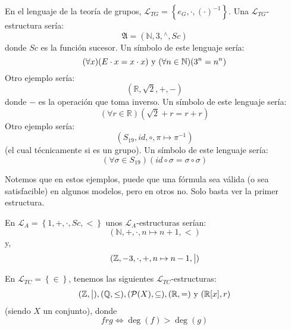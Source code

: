 \documentclass[12pt]{report}
\theoremstyle{largebreak}
\newcommand\divides{\ensuremath{\bigm|}}
\begin{document}
    \begin{exa}
        En el lenguaje de la teoría de grupos, $\mathcal{L}_{TG}=\left\{e_G,\cdot,(\cdot)^{-1} \right\}$. Una $\mathcal{L}_{TG}$-estructura sería:
        \begin{equation*}
            \mathfrak{A}=(\mathbb{N},3,{}^{\wedge},Sc)
        \end{equation*}
        donde $Sc$ es la función sucesor. Un símbolo de este lenguaje sería:
        \begin{equation*}
            (\forall x)(E\cdot x=x\cdot x)\textup{ y }(\forall n\in\mathbb{N})(3^n=n^n)
        \end{equation*}
        Otro ejemplo sería:
        \begin{equation*}
            (\mathbb{R},\sqrt{2},+,-)
        \end{equation*}
        donde $-$ es la operación que toma inverso. Un símbolo de este lenguaje sería:
        \begin{equation*}
            (\forall r\in\mathbb{R})(\sqrt{2}+r=r+r)
        \end{equation*}        
        Otro ejemplo sería:
        \begin{equation*}
            (S_{19},id,\circ,\pi\mapsto\pi^{-1})
        \end{equation*}
        (el cual técnicamente si es un grupo). Un símbolo de este lenguaje sería:
        \begin{equation*}
            (\forall \sigma\in S_{19})(id\circ\sigma=\sigma\circ\sigma)
        \end{equation*}
    \end{exa}

    Notemos que en estos ejemplos, puede que una fórmula sea válida (o sea satisfacible) en algunos modelos, pero en otros no. Solo basta ver la primer estructura.

    \begin{exa}
        En $\mathcal{L}_{A}=\left\{1,+,\cdot,Sc,< \right\}$ unos $\mathcal{L}_A$-estructuras serían:
        \begin{equation*}
            (\mathbb{N},+,\cdot,n\mapsto n+1,<)
        \end{equation*}
        y,
        \begin{equation*}
            (\mathbb{Z},-3,\cdot,+,n\mapsto n-1,\divides)
        \end{equation*}
    \end{exa}

    \begin{exa}
        En $\mathcal{L}_{TC}=\left\{\in \right\}$, tenemos las siguientes $\mathcal{L}_{TC}$-estructuras:
        \begin{equation*}
            (\mathbb{Z},\divides),(\mathbb{Q},\leq),(\mathcal{P}(X),\subseteq), (\mathbb{R},=) \textup{ y } (\mathbb{R}[x],r)
        \end{equation*}
        (siendo $X$ un conjunto), donde
        \begin{equation*}
            frg\iff \deg(f)>\deg(g)
        \end{equation*}
    \end{exa}
\end{document}
